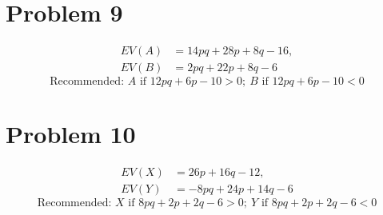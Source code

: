 \section*{Problem 9}
\[
\begin{aligned}
	EV(A) &= 14pq+28p+8q-16,\\
	EV(B) &= 2pq+22p+8q-6
\end{aligned}
\]
\[
\text{Recommended: } A \text{ if } 12pq+6p-10>0;\ B \text{ if } 12pq+6p-10<0
\]

\section*{Problem 10}
\[
\begin{aligned}
	EV(X) &= 26p+16q-12,\\
	EV(Y) &= -8pq+24p+14q-6
\end{aligned}
\]
\[
\text{Recommended: } X \text{ if } 8pq+2p+2q-6>0;\ Y \text{ if } 8pq+2p+2q-6<0
\]


